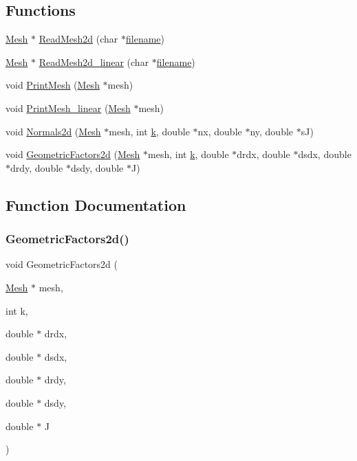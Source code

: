 \subsection*{Functions}
\begin{DoxyCompactItemize}
\item 
\hyperlink{a00557_aeffbe0891ab73a4d8964c9cb7978426e}{Mesh} $\ast$ \hyperlink{a00581_af31fd6654ededed596d98c090d8748b5}{Read\+Mesh2d} (char $\ast$\hyperlink{a00623_a42a21beb8018ac623f4d09db1343b9cf}{filename})
\item 
\hyperlink{a00557_aeffbe0891ab73a4d8964c9cb7978426e}{Mesh} $\ast$ \hyperlink{a00581_a992690ab68b8564681b5a038ca111413}{Read\+Mesh2d\+\_\+linear} (char $\ast$\hyperlink{a00623_a42a21beb8018ac623f4d09db1343b9cf}{filename})
\item 
void \hyperlink{a00581_ad62a25bbacac8912e4932b3163c885f0}{Print\+Mesh} (\hyperlink{a00557_aeffbe0891ab73a4d8964c9cb7978426e}{Mesh} $\ast$mesh)
\item 
void \hyperlink{a00581_a0f8fa1f045215f1ea478f91156eb0317}{Print\+Mesh\+\_\+linear} (\hyperlink{a00557_aeffbe0891ab73a4d8964c9cb7978426e}{Mesh} $\ast$mesh)
\item 
void \hyperlink{a00581_a6e05f4bc3238ae8e045ddc269dd77f74}{Normals2d} (\hyperlink{a00557_aeffbe0891ab73a4d8964c9cb7978426e}{Mesh} $\ast$mesh, int \hyperlink{a00605_a6086917dfee54d84abe1838505c8cf69}{k}, double $\ast$nx, double $\ast$ny, double $\ast$sJ)
\item 
void \hyperlink{a00581_a17dce51b6f44350809fb0f67f41bf80a}{Geometric\+Factors2d} (\hyperlink{a00557_aeffbe0891ab73a4d8964c9cb7978426e}{Mesh} $\ast$mesh, int \hyperlink{a00605_a6086917dfee54d84abe1838505c8cf69}{k}, double $\ast$drdx, double $\ast$dsdx, double $\ast$drdy, double $\ast$dsdy, double $\ast$J)
\end{DoxyCompactItemize}


\subsection{Function Documentation}
\mbox{\label{a00581_a17dce51b6f44350809fb0f67f41bf80a}} 
\subsubsection{\texorpdfstring{Geometric\+Factors2d()}{GeometricFactors2d()}}
{\footnotesize\ttfamily void Geometric\+Factors2d (\begin{DoxyParamCaption}\item[{\hyperlink{a00557_aeffbe0891ab73a4d8964c9cb7978426e}{Mesh} $\ast$}]{mesh,  }\item[{int}]{k,  }\item[{double $\ast$}]{drdx,  }\item[{double $\ast$}]{dsdx,  }\item[{double $\ast$}]{drdy,  }\item[{double $\ast$}]{dsdy,  }\item[{double $\ast$}]{J }\end{DoxyParamCaption})}

